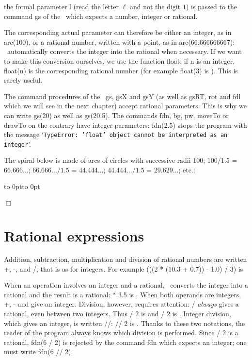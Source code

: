 \noindent the formal parameter {\idt l} (read the letter $\ell$ and not the digit $1$) is passed to the command {\idt gs} of the \robot\ which
expects a number, integer or rational.

The corresponding actual parameter can therefore be either an integer, as in
{\idt arc(100)}, or a rational number, written with a point, as in {\idt arc(66.666666667)}:
\python\ automatically converts the integer {} into the rational {}
when necessary. If we want to make this conversion ourselves, we use the
function {\idt float}: if {\idt n} is an integer,
{\idt float(n)} is the corresponding rational number (for example
{\idt float(3)} is {}). This is rarely useful.

The command procedures of the \robot\ {\idt gs}, {\idt gsX} and {\idt gsY} (as well as
{\idt gsRT}, {\idt rot} and {\idt fdl} which we will see in the next chapter) accept rational
parameters. This is why we can write {\idt gs(20)} as well as {\idt gs(20.5)}.
The commands {\idt fdn}, {\idt bg}, {\idt pw}, {\idt moveTo} or {\idt drawTo}
on the contrary have integer parameters: {\idt fdn(2.5)} stops the program with the message
`{\tt TypeError:\ 'float' object cannot be interpreted as an integer}'.

\begin{exemple}{\rm
The spiral below is made of arcs of circles with successive radii
$100$; $100 / 1.5$ = $66.666\ldots$; $66.666\ldots / 1.5$ = $44.444\ldots$;
$44.444\ldots / 1.5$ = $29.629\ldots$; etc.:

 {\raggedright
 \hbox to 0pt{\hspace*{2cm}\vbox to 0pt{}}
 
 }
\noindent $\Box$ }\end{exemple}

\section{Rational expressions}
Addition, subtraction, multiplication and division of rational numbers are
written {\idt +}, {\idt -}, {\idt *} and {\idt /}, that is as for integers. For example
{\idt (((2 * (10.3 + 0.7)) - 1.0) / 3)} is {}

When an operation involves an integer and a rational, \python\ converts the integer into a
rational and the result is a rational: { * 3.5} is {}.
When both operands are integers, {\idt +}, {\idt -} and {\idt *} give an integer.
Division, however, requires attention: {\idt /} {\em always} gives a rational,
even between two integers. Thus { / 2} is {} and { / 2} is {}.
Integer division, which gives an integer, is written {\idt //}: { // 2} is {}.
Thanks to these two notations, the reader of the program always knows which division is performed.
Since { / 2} is a rational, {\idt fdn(6 / 2)} is rejected by the command {\idt fdn}
which expects an integer; one must write {\idt fdn(6 // 2)}.

